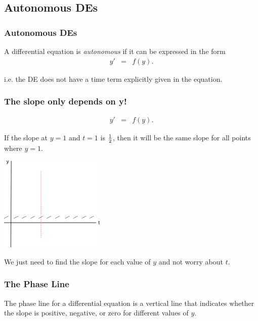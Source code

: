 \subsection{Autonomous DEs}

\begin{frame}
  \frametitle{Autonomous DEs}

  A differential equation is \textit{autonomous} if it can be
  expressed in the form
  \begin{eqnarray*}
    y' & = & f(y).
  \end{eqnarray*}

  i.e. the DE does not have a time term explicitly given in the
  equation.


\end{frame}


\begin{frame}
  \frametitle{The slope only depends on y!}

  \vspace*{-3em}
  \begin{eqnarray*}
    y' & = & f(y).
  \end{eqnarray*}

  If the slope at $y=1$ and $t=1$ is $\mbox{$\frac{1}{2}$}$, then it will be the same
  slope for all points where $y=1$. 

  \vfill
  \includegraphics[width=5cm]{img/autonomousEqnSlopeField}
  \vfill

  We just need to find the slope for each value of $y$ and not worry
  about $t$.

\end{frame}

\begin{frame}
  \frametitle{The Phase Line}

  The phase line for a differential equation is a vertical line that
  indicates whether the slope is positive, negative, or zero for
  different values of $y$.
\end{frame}

